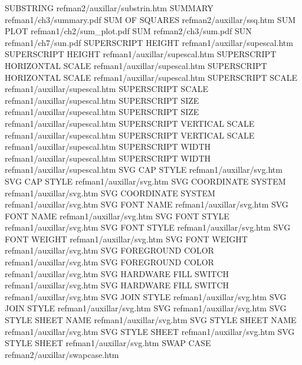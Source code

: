 SUBSTRING                               refman2/auxillar/substrin.htm
SUMMARY                                 refman1/ch3/summary.pdf
SUM OF SQUARES                          refman2/auxillar/ssq.htm
SUM PLOT                                refman1/ch2/sum_plot.pdf
SUM                                     refman2/ch3/sum.pdf
SUN                                     refman1/ch7/sun.pdf
SUPERSCRIPT HEIGHT                      refman1/auxillar/supescal.htm
SUPERSCRIPT HEIGHT                      refman1/auxillar/supescal.htm
SUPERSCRIPT HORIZONTAL SCALE            refman1/auxillar/supescal.htm
SUPERSCRIPT HORIZONTAL SCALE            refman1/auxillar/supescal.htm
SUPERSCRIPT SCALE                       refman1/auxillar/supescal.htm
SUPERSCRIPT SCALE                       refman1/auxillar/supescal.htm
SUPERSCRIPT SIZE                        refman1/auxillar/supescal.htm
SUPERSCRIPT SIZE                        refman1/auxillar/supescal.htm
SUPERSCRIPT VERTICAL SCALE              refman1/auxillar/supescal.htm
SUPERSCRIPT VERTICAL SCALE              refman1/auxillar/supescal.htm
SUPERSCRIPT WIDTH                       refman1/auxillar/supescal.htm
SUPERSCRIPT WIDTH                       refman1/auxillar/supescal.htm
SVG CAP STYLE                           refman1/auxillar/svg.htm
SVG CAP STYLE                           refman1/auxillar/svg.htm
SVG COORDINATE SYSTEM                   refman1/auxillar/svg.htm
SVG COORDINATE SYSTEM                   refman1/auxillar/svg.htm
SVG FONT NAME                           refman1/auxillar/svg.htm
SVG FONT NAME                           refman1/auxillar/svg.htm
SVG FONT STYLE                          refman1/auxillar/svg.htm
SVG FONT STYLE                          refman1/auxillar/svg.htm
SVG FONT WEIGHT                         refman1/auxillar/svg.htm
SVG FONT WEIGHT                         refman1/auxillar/svg.htm
SVG FOREGROUND COLOR                    refman1/auxillar/svg.htm
SVG FOREGROUND COLOR                    refman1/auxillar/svg.htm
SVG HARDWARE FILL SWITCH                refman1/auxillar/svg.htm
SVG HARDWARE FILL SWITCH                refman1/auxillar/svg.htm
SVG JOIN STYLE                          refman1/auxillar/svg.htm
SVG JOIN STYLE                          refman1/auxillar/svg.htm
SVG                                     refman1/auxillar/svg.htm
SVG STYLE SHEET NAME                    refman1/auxillar/svg.htm
SVG STYLE SHEET NAME                    refman1/auxillar/svg.htm
SVG STYLE SHEET                         refman1/auxillar/svg.htm
SVG STYLE SHEET                         refman1/auxillar/svg.htm
SWAP CASE                               refman2/auxillar/swapcase.htm
